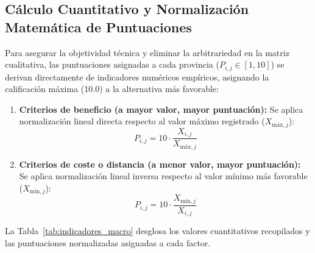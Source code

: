 \documentclass{report}
\begin{document}
\subsection{Cálculo Cuantitativo y Normalización Matemática de Puntuaciones}
Para asegurar la objetividad técnica y eliminar la arbitrariedad en la matriz cualitativa, las puntuaciones asignadas a cada provincia ($P_{i,j} \in [1, 10]$) se derivan directamente de indicadores numéricos empíricos, asignando la calificación máxima (\num{10.0}) a la alternativa más favorable:
\begin{enumerate}
    \item \textbf{Criterios de beneficio (a mayor valor, mayor puntuación):} Se aplica normalización lineal directa respecto al valor máximo registrado ($X_{\text{máx},j}$):
          \begin{equation}
              P_{i,j} = 10 \cdot \frac{X_{i,j}}{X_{\text{máx},j}}
          \end{equation}
    \item \textbf{Criterios de coste o distancia (a menor valor, mayor puntuación):} Se aplica normalización lineal inversa respecto al valor mínimo más favorable ($X_{\text{mín},j}$):
          \begin{equation}
              P_{i,j} = 10 \cdot \frac{X_{\text{mín},j}}{X_{i,j}}
          \end{equation}
\end{enumerate}

La Tabla~\ref{tab:indicadores_macro} desglosa los valores cuantitativos recopilados y las puntuaciones normalizadas asignadas a cada factor.
\end{document}
